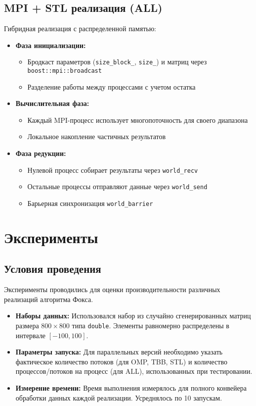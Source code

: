 \documentclass[12pt]{article}
\begin{document}
\subsection{MPI + STL реализация (ALL)}
Гибридная реализация с распределенной памятью:
\begin{itemize}
    \item \textbf{Фаза инициализации:}
    \begin{itemize}
        \item Бродкаст параметров (\texttt{size\_block\_}, \texttt{size\_}) и матриц через \texttt{boost::mpi::broadcast}
        \item Разделение работы между процессами с учетом остатка
    \end{itemize}
    \item \textbf{Вычислительная фаза:}
    \begin{itemize}
        \item Каждый MPI-процесс использует многопоточность для своего диапазона
        \item Локальное накопление частичных результатов
    \end{itemize}
    \item \textbf{Фаза редукции:}
    \begin{itemize}
        \item Нулевой процесс собирает результаты через \texttt{world\_recv}
        \item Остальные процессы отправляют данные через \texttt{world\_send}
        \item Барьерная синхронизация \texttt{world\_barrier}
    \end{itemize}
\end{itemize}



\newpage
\section{Эксперименты}
\subsection{Условия проведения}
Эксперименты проводились для оценки производительности различных реализаций алгоритма Фокса.
\begin{itemize}
    \item \textbf{Наборы данных:} Использовался набор из случайно сгенерированных матриц размера $800 \times 800$ типа \texttt{double}. Элементы равномерно распределены в интервале $[-100, 100]$.

    
    \item \textbf{Параметры запуска:} Для параллельных версий необходимо указать фактическое количество потоков (для OMP, TBB, STL) и количество процессов/потоков на процесс (для ALL), использованных при тестировании.
    \item \textbf{Измерение времени:} Время выполнения измерялось для полного конвейера обработки данных каждой реализации. Усреднялось по 10 запускам.
\end{itemize}
\end{document}
